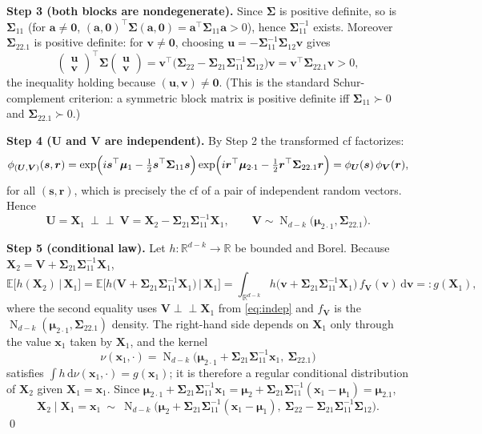 \documentclass{MFM-hw} %
\newcommand{\real}{\mathbb{R}}
\newcommand{\normal}{\operatorname{N}}
\newcommand{\dd}{\,\mathrm{d}}
\newcommand{\E}{\mathbb{E}}
\newcommand{\inde}{\perp\!\!\!\perp}
\newcommand{\bX}{\bm{X}}
\newcommand{\bx}{\bm{x}}
\newcommand{\bs}{\bm{s}}
\newcommand{\bu}{\bm{u}}
\newcommand{\bv}{\bm{v}}
\newcommand{\ba}{\bm{a}}
\newcommand{\bU}{\bm{U}}
\newcommand{\bV}{\bm{V}}
\newcommand{\br}{\bm{r}}
\newcommand{\bmu}{\bm{\mu}}
\newcommand{\bSigma}{\bm{\Sigma}}
\newcommand{\bzero}{\bm{0}}
\begin{document}
\smallskip
\noindent\textbf{Step 3 (both blocks are nondegenerate).} Since $\bSigma$ is positive definite, so is $\bSigma_{11}$ (for $\ba\ne\bzero$, $(\ba,\bzero)^\top\bSigma(\ba,\bzero)=\ba^\top\bSigma_{11}\ba>0$), hence $\bSigma_{11}^{-1}$ exists. Moreover $\bSigma_{22.1}$ is positive definite: for $\bv\ne\bzero$, choosing $\bu=-\bSigma_{11}^{-1}\bSigma_{12}\bv$ gives
\[
    \begin{pmatrix}\bu\\ \bv\end{pmatrix}^\top\bSigma\begin{pmatrix}\bu\\ \bv\end{pmatrix}
    =\bv^\top\bigl(\bSigma_{22}-\bSigma_{21}\bSigma_{11}^{-1}\bSigma_{12}\bigr)\bv=\bv^\top\bSigma_{22.1}\bv>0,
\]
the inequality holding because $(\bu,\bv)\ne\bzero$. (This is the standard Schur-complement criterion: a symmetric block matrix is positive definite iff $\bSigma_{11}\succ0$ and $\bSigma_{22.1}\succ0$.)

\smallskip
\noindent\textbf{Step 4 ($\bU$ and $\bV$ are independent).} By Step 2 the transformed cf factorizes:
\[
    \phi_{(\bU,\bV)}(\bs,\br)
    =\exp\Bigl(i\bs^\top\bmu_1-\tfrac12\bs^\top\bSigma_{11}\bs\Bigr)
     \exp\Bigl(i\br^\top\bmu_{2\cdot1}-\tfrac12\br^\top\bSigma_{22.1}\br\Bigr)
    =\phi_{\bU}(\bs)\,\phi_{\bV}(\br),
\]
for all $(\bs,\br)$, which is precisely the cf of a pair of independent random vectors. Hence
\begin{equation}\label{eq:indep}
    \bU=\bX_1\ \inde\ \bV=\bX_2-\bSigma_{21}\bSigma_{11}^{-1}\bX_1,
    \qquad \bV\sim\normal_{d-k}\bigl(\bmu_{2\cdot1},\bSigma_{22.1}\bigr).
\end{equation}

\smallskip
\noindent\textbf{Step 5 (conditional law).} Let $h:\real^{d-k}\to\real$ be bounded and Borel. Because $\bX_2=\bV+\bSigma_{21}\bSigma_{11}^{-1}\bX_1$,
\[
    \E\bigl[h(\bX_2)\,\big|\,\bX_1\bigr]
    =\E\bigl[h\bigl(\bV+\bSigma_{21}\bSigma_{11}^{-1}\bX_1\bigr)\,\big|\,\bX_1\bigr]
    =\int_{\real^{d-k}} h\bigl(\bv+\bSigma_{21}\bSigma_{11}^{-1}\bX_1\bigr)\,f_{\bV}(\bv)\dd\bv
    =:g(\bX_1),
\]
where the second equality uses $\bV\inde\bX_1$ from \eqref{eq:indep} and $f_{\bV}$ is the $\normal_{d-k}(\bmu_{2\cdot1},\bSigma_{22.1})$ density. The right-hand side depends on $\bX_1$ only through the value $\bx_1$ taken by $\bX_1$, and the kernel
\[
    \nu(\bx_1,\cdot)=\normal_{d-k}\bigl(\bmu_{2\cdot1}+\bSigma_{21}\bSigma_{11}^{-1}\bx_1,\ \bSigma_{22.1}\bigr)
\]
satisfies $\int h\dd\nu(\bx_1,\cdot)=g(\bx_1)$; it is therefore a regular conditional distribution of $\bX_2$ given $\bX_1=\bx_1$. Since $\bmu_{2\cdot1}+\bSigma_{21}\bSigma_{11}^{-1}\bx_1=\bmu_2+\bSigma_{21}\bSigma_{11}^{-1}(\bx_1-\bmu_1)=\bmu_{2.1}$,
\begin{equation}\label{eq:cond}
    \boxed{\;\bX_2\mid\bX_1=\bx_1\ \sim\ \normal_{d-k}\bigl(\bmu_2+\bSigma_{21}\bSigma_{11}^{-1}(\bx_1-\bmu_1),\ \bSigma_{22}-\bSigma_{21}\bSigma_{11}^{-1}\bSigma_{12}\bigr).\;}
\end{equation}
\qed
\end{document}

